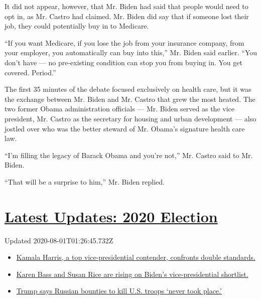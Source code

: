 It did not appear, however, that Mr. Biden had said that people would
need to opt in, as Mr. Castro had claimed. Mr. Biden did say that if
someone lost their job, they could potentially buy in to Medicare.

``If you want Medicare, if you lose the job from your insurance company,
from your employer, you automatically can buy into this,'' Mr. Biden
said earlier. ``You don't have --- no pre-existing condition can stop
you from buying in. You get covered. Period.''

The first 35 minutes of the debate focused exclusively on health care,
but it was the exchange between Mr. Biden and Mr. Castro that grew the
most heated. The two former Obama administration officials --- Mr. Biden
served as the vice president, Mr. Castro as the secretary for housing
and urban development --- also jostled over who was the better steward
of Mr. Obama's signature health care law.

``I'm filling the legacy of Barack Obama and you're not,'' Mr. Castro
said to Mr. Biden.

``That will be a surprise to him,'' Mr. Biden replied.

\hypertarget{latest-updates-2020-election}{%
\section{\texorpdfstring{\href{https://www.nytimes.com/2020/07/31/us/elections/biden-vs-trump.html?action=click\&pgtype=Article\&state=default\&region=MAIN_CONTENT_1\&context=storylines_live_updates}{Latest
Updates: 2020
Election}}{Latest Updates: 2020 Election}}\label{latest-updates-2020-election}}

Updated 2020-08-01T01:26:45.732Z

\begin{itemize}
\tightlist
\item
  \href{https://www.nytimes.com/2020/07/31/us/elections/biden-vs-trump.html?action=click\&pgtype=Article\&state=default\&region=MAIN_CONTENT_1\&context=storylines_live_updates\#link-29fdff45}{Kamala
  Harris, a top vice-presidential contender, confronts double
  standards.}
\item
  \href{https://www.nytimes.com/2020/07/31/us/elections/biden-vs-trump.html?action=click\&pgtype=Article\&state=default\&region=MAIN_CONTENT_1\&context=storylines_live_updates\#link-13ec3d9c}{Karen
  Bass and Susan Rice are rising on Biden's vice-presidential
  shortlist.}
\item
  \href{https://www.nytimes.com/2020/07/31/us/elections/biden-vs-trump.html?action=click\&pgtype=Article\&state=default\&region=MAIN_CONTENT_1\&context=storylines_live_updates\#link-49e9a016}{Trump
  says Russian bounties to kill U.S. troops `never took place.'}
\end{itemize}

